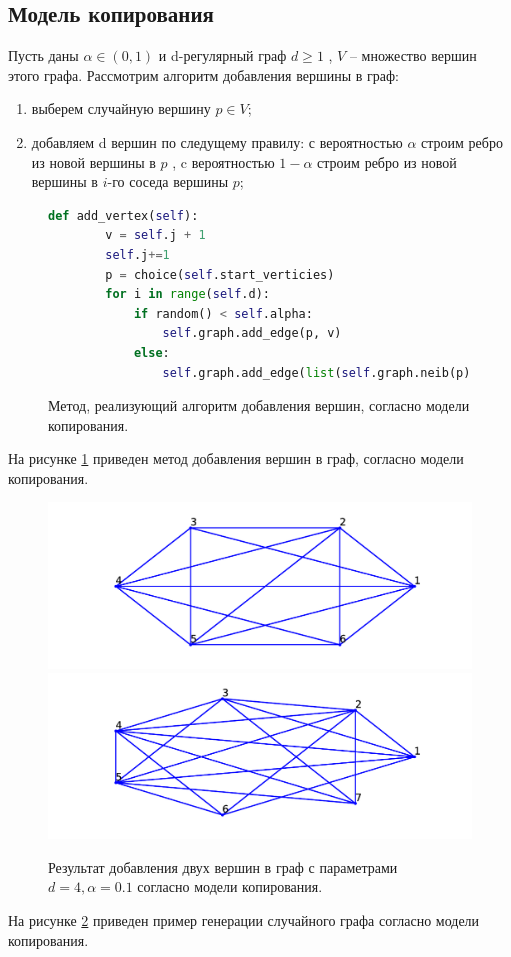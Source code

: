 \subsection{Модель копирования}
Пусть даны $\alpha \in (0,1)$ и 
 d-регулярный граф $d \ge  1$ , $V$ -- множество вершин этого графа. Рассмотрим алгоритм добавления вершины в граф:
 \begin{enumerate}
     \item выберем случайную вершину $p \in V$;
     \item добавляем d вершин по следущему правилу:
         с вероятностью $\alpha$ строим ребро из новой вершины 
         в  $p$ , c вероятностью $1 - \alpha$ строим
         ребро из новой вершины в  $i$-го соседа вершины  $p$;
 \end{enumerate}
 \begin{figure}[H] 
 \begin{lstlisting}[language=Python] 
    def add_vertex(self):
        v = self.j + 1
        self.j+=1
        p = choice(self.start_verticies)
        for i in range(self.d):
            if random() < self.alpha:
                self.graph.add_edge(p, v)
            else:
                self.graph.add_edge(list(self.graph.neib(p))[i], v)
 \end{lstlisting}  
     \caption{Метод, реализующий алгоритм добавления вершин,
     согласно модели копирования.}
     \label{cop1}
 \end{figure} 
 На рисунке \ref{cop1} приведен метод 
добавления вершин в граф, согласно модели копирования.
\begin{figure}[H] 
    \includegraphics[scale=0.8]{cop1.pdf} 
    \includegraphics[scale=0.8]{cop2.pdf} 
    \caption{Результат добавления двух вершин в граф 
    с параметрами $d = 4,\alpha = 0.1$ согласно модели копирования.}
    \label{cop2}
\end{figure} 
На рисунке \ref{cop2} приведен пример генерации случайного графа согласно модели копирования.
